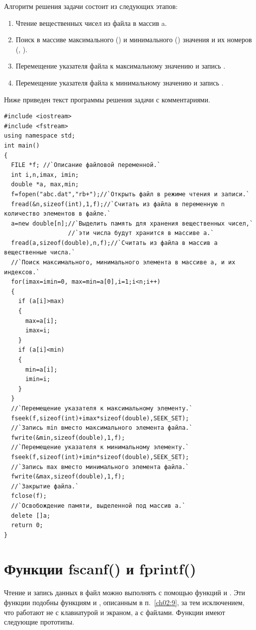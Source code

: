 Алгоритм решения задачи состоит из следующих этапов:

\begin{enumerate}
\item Чтение вещественных чисел из файла в массив a.
\item Поиск в массиве  максимального () и минимального
() значения и их номеров (, ).
\item Перемещение указателя файла к максимальному значению и запись .
\item Перемещение указателя файла к минимальному значению и запись .
\end{enumerate}
Ниже приведен текст программы решения задачи с комментариями.
\begin{lstlisting}
#include <iostream>
#include <fstream>
using namespace std;
int main()
{
  FILE *f; //`Описание файловой переменной.` 
  int i,n,imax, imin;
  double *a, max,min;
  f=fopen("abc.dat","rb+");//`Открыть файл в режиме чтения и записи.`
  fread(&n,sizeof(int),1,f);//`Считать из файла в переменную n количество элементов в файле.`
  a=new double[n];//`Выделить память для хранения вещественных чисел,`
                  //`эти числа будут хранится в массиве a.`
  fread(a,sizeof(double),n,f);//`Считать из файла в массив a вещественные числа.`
  //`Поиск максимального, минимального элемента в массиве a, и их индексов.`
  for(imax=imin=0, max=min=a[0],i=1;i<n;i++) 
  {
    if (a[i]>max) 
    {
      max=a[i];
      imax=i;
    }
    if (a[i]<min)
    {
      min=a[i];
      imin=i;
    }
  }
  //`Перемещение указателя к максимальному элементу.`
  fseek(f,sizeof(int)+imax*sizeof(double),SEEK_SET);
  //`Запись min вместо максимального элемента файла.`
  fwrite(&min,sizeof(double),1,f);
  //`Перемещение указателя к минимальному элементу.`
  fseek(f,sizeof(int)+imin*sizeof(double),SEEK_SET);
  //`Запись max вместо минимального элемента файла.`
  fwrite(&max,sizeof(double),1,f);
  //`Закрытие файла.`
  fclose(f);
  //`Освобождение памяти, выделенной под массив a.`
  delete []a;
  return 0;
}
\end{lstlisting}

\section[Функции fscanf() и fprintf()]{Функции fscanf() и fprintf()}
Чтение и запись данных в файл можно выполнять с помощью функций  и
. Эти функции подобны функциям  и
, описанным в п.~\ref{ch02:9}, за тем исключением, что работают не с клавиатурой и
экраном, а с файлами. Функции имеют следующие прототипы.

